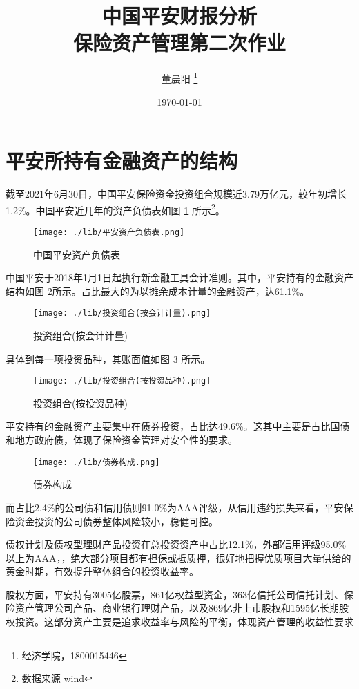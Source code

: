 \documentclass[11pt]{ctexart}
\author{董晨阳 \footnote{经济学院，1800015446}}
\date{\today}
\title{中国平安财报分析\\\large{保险资产管理第二次作业}}
\begin{document}
\maketitle
\tableofcontents

\newpage
\section{平安所持有金融资产的结构}
\label{sec:org68f553e}
截至2021年6月30日，中国平安保险资金投资组合规模近3.79万亿元，较年初增长1.2\%。中国平安近几年的资产负债表如图 \ref{fig:balancesheet} 所示\footnote{数据来源 wind}。

\begin{figure}[htbp]
\centering
\texttt{[image: ./lib/平安资产负债表.png]}
\caption{\label{fig:balancesheet}中国平安资产负债表}
\end{figure}

中国平安于2018年1月1日起执行新金融工具会计准则。其中，平安持有的金融资产结构如图 \ref{fig:portfolio}所示。占比最大的为以摊余成本计量的金融资产，达61.1\%。

\begin{figure}[htbp]
\centering
\texttt{[image: ./lib/投资组合(按会计计量).png]}
\caption{\label{fig:portfolio}投资组合(按会计计量)}
\end{figure}

具体到每一项投资品种，其账面值如图 \ref{fig:portfolio2} 所示。

\begin{figure}[htbp]
\centering
\texttt{[image: ./lib/投资组合(按投资品种).png]}
\caption{\label{fig:portfolio2}投资组合(按投资品种)}
\end{figure}

平安持有的金融资产主要集中在债券投资，占比达49.6\%。这其中主要是占比国债和地方政府债，体现了保险资金管理对安全性的要求。
\begin{figure}[htbp]
\centering
\texttt{[image: ./lib/债券构成.png]}
\caption{\label{fig:bond}债券构成}
\end{figure}

而占比2.4\%的公司债和信用债则91.0\%为AAA评级，从信用违约损失来看，平安保险资金投资的公司债券整体风险较小，稳健可控。

债权计划及债权型理财产品投资在总投资资产中占比12.1\%，外部信用评级95.0\%以上为AAA，，绝大部分项目都有担保或抵质押，很好地把握优质项目大量供给的黄金时期，有效提升整体组合的投资收益率。

股权方面，平安持有3005亿股票，861亿权益型资金，363亿信托公司信托计划、保险资产管理公司产品、商业银行理财产品，以及869亿非上市股权和1595亿长期股权投资。这部分资产主要是追求收益率与风险的平衡，体现资产管理的收益性要求
\end{document}
